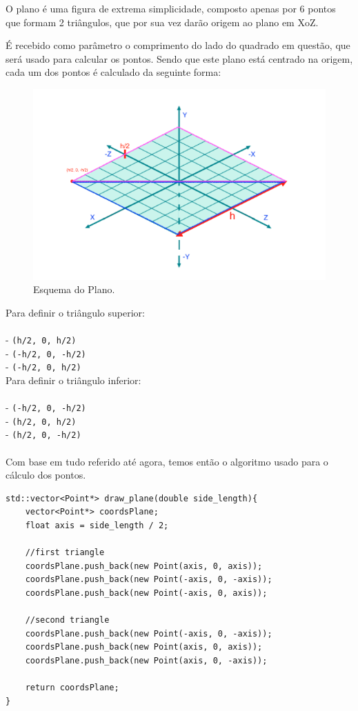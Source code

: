 \documentclass[a4paper]{article}
\begin{document}
O plano é uma figura de extrema simplicidade, composto apenas por 6 pontos que formam 2 triângulos, que por sua vez darão origem ao plano em XoZ.


É recebido como parâmetro o comprimento do lado do quadrado em questão, que será usado para calcular os pontos. Sendo que este plano está centrado na origem, cada um dos pontos é calculado da seguinte forma:
\\
\begin{figure}[H]
\centering
\includegraphics[width=0.5\linewidth]{esquemaPlano.PNG}
\caption{Esquema do Plano.}
\end{figure}

Para definir o triângulo superior:\\
\\
-  \texttt{(h/2, 0, h/2)}\\
-  \texttt{(-h/2, 0, -h/2)}\\
-  \texttt{(-h/2, 0, h/2)}\\

Para definir o triângulo inferior:\\
\\
-  \texttt{(-h/2, 0, -h/2)}\\
-  \texttt{(h/2, 0, h/2)}\\
-  \texttt{(h/2, 0, -h/2)}\\
\\
Com base em tudo referido até agora, temos então o algoritmo usado para o cálculo dos pontos.\\
\begin{lstlisting}
std::vector<Point*> draw_plane(double side_length){
    vector<Point*> coordsPlane;
    float axis = side_length / 2;

    //first triangle
    coordsPlane.push_back(new Point(axis, 0, axis));
    coordsPlane.push_back(new Point(-axis, 0, -axis));
    coordsPlane.push_back(new Point(-axis, 0, axis));

    //second triangle
    coordsPlane.push_back(new Point(-axis, 0, -axis));
    coordsPlane.push_back(new Point(axis, 0, axis));
    coordsPlane.push_back(new Point(axis, 0, -axis));

    return coordsPlane;
}

\end{lstlisting}
\end{document}
